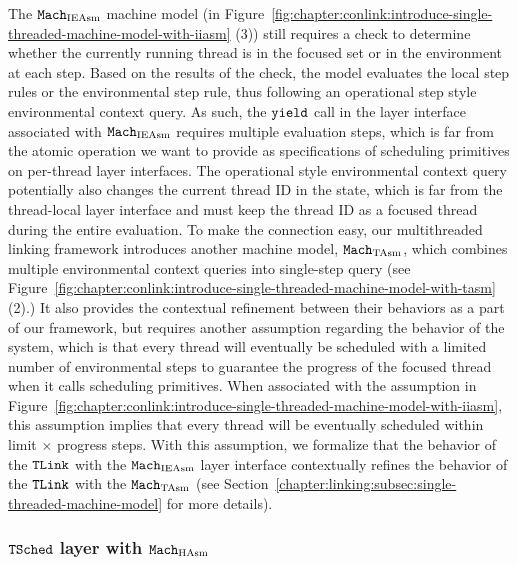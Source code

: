 The ${\mathrm{\texttt{Mach}}}_{\mathrm{IEAsm}}$ machine model  (in Figure~\ref{fig:chapter:conlink:introduce-single-threaded-machine-model-with-iiasm}  (3)) 
still requires a check to determine whether the currently running thread is in the focused set or in the environment at each step. 
Based on the results of the check, the model evaluates the local step rules or the environmental step rule, 
thus following an operational step style environmental context query. 
As such, the ${\mathrm{\texttt{yield}}}$ call in the layer interface associated with
 ${\mathrm{\texttt{Mach}}}_{\mathrm{IEAsm}}$ 
requires multiple evaluation steps, which is far from the atomic operation we want to provide as specifications of scheduling primitives on per-thread layer interfaces. 
The operational style environmental context query potentially also changes the current thread ID in the state, 
which is far from the thread-local layer interface and must keep the thread ID as a focused thread during the entire evaluation. 
To make the connection easy, our multithreaded linking framework introduces another machine model, ${\mathrm{\texttt{Mach}}}_{\mathrm{TAsm}}$, which combines multiple environmental context queries into single-step query (see Figure~\ref{fig:chapter:conlink:introduce-single-threaded-machine-model-with-tasm} (2).) 
It also provides the contextual refinement between their behaviors as a part of our framework, 
but requires another assumption regarding the behavior of the system, which is that every thread will eventually be scheduled with a limited number of environmental steps to guarantee the progress of the focused thread when it calls scheduling primitives. 
When associated with the assumption in Figure~\ref{fig:chapter:conlink:introduce-single-threaded-machine-model-with-iiasm},
 this assumption implies that every thread will be eventually scheduled within limit $\times$ progress steps. With this assumption, we formalize that the behavior of the ${{\mathrm{\texttt{TLink}}}}$ with the ${\mathrm{\texttt{Mach}}}_{\mathrm{IEAsm}}$ layer interface contextually refines the behavior of the ${{\mathrm{\texttt{TLink}}}}$  with the ${\mathrm{\texttt{Mach}}}_{\mathrm{TAsm}}$ 
 (see Section~\ref{chapter:linking:subsec:single-threaded-machine-model}  for more details).
 
 

\subsubsection{${{\mathrm{\texttt{TSched}}}}$ layer with ${\mathrm{\texttt{Mach}}}_{\mathrm{HAsm}}$} 



